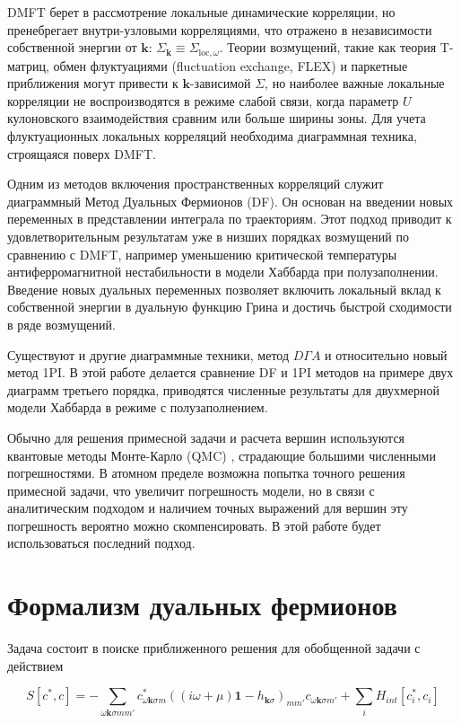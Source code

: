 \documentclass[11pt,a4paper]{report}
\begin{document}
DMFT берет в рассмотрение локальные динамические корреляции, но пренебрегает внутри-узловыми корреляциями, что отражено в независимости собственной энергии от $\mathbf{k}$: $\Sigma_\mathbf{k}\equiv \Sigma_{\text{loc},\omega}$. 
Теории возмущений, такие как теория T-матриц, обмен флуктуациями (fluctuation exchange, FLEX) и паркетные приближения\cite{bickers} могут привести к $\mathbf{k}$-зависимой $\Sigma$,
но наиболее важные локальные корреляции не воспроизводятся в режиме слабой связи, когда параметр $U$ кулоновского взаимодействия сравним или больше ширины зоны.
Для учета флуктуационных локальных корреляций необходима диаграммная техника, строящаяся поверх DMFT.

Одним из методов включения пространственных корреляций служит диаграммный Метод Дуальных Фермионов (DF)\cite{PhysRevB.77.033101}. Он основан на введении новых переменных в представлении интеграла по траекториям.
Этот подход приводит к удовлетворительным результатам уже в низших порядках возмущений по сравнению с DMFT, например уменьшению критической температуры антиферромагнитной нестабильности в модели Хаббарда 
при полузаполнении\cite{PhysRevB.77.195105}. Введение новых дуальных переменных позволяет включить локальный вклад к собственной энергии в дуальную функцию Грина и достичь быстрой сходимости в ряде возмущений.

Существуют и другие диаграммные техники, метод $D\Gamma A$\cite{toschi2007dynamical}\cite{katanin2009comparing} и относительно новый метод 1PI\cite{katanin}. 
В этой работе делается сравнение DF и 1PI методов на примере двух диаграмм третьего порядка, приводятся численные результаты для двухмерной модели Хаббарда в режиме с полузаполнением.

Обычно для решения примесной задачи и расчета вершин используются квантовые методы Монте-Карло (QMC) \cite{rubtsov2005continuous}, страдающие большими численными погрешностями. 
В атомном пределе возможна попытка точного решения примесной задачи, что увеличит погрешность модели, но в связи с аналитическим подходом и наличием точных выражений для вершин эту погрешность вероятно
можно скомпенсировать. В этой работе будет использоваться последний подход.

\section{Формализм дуальных фермионов}
Задача состоит в поиске приближенного решения для обобщенной задачи с действием

\begin{equation}
\label{action}
 S\left[c^*,c\right] = - \sum_{\omega\mathbf{k}\sigma m m'} c^*_{\omega\mathbf{k}\sigma m} ((i\omega+\mu)\mathbf{1}-h_{\mathbf{k}\sigma})_{m m'}c_{\omega\mathbf{k}\sigma m'} + \sum_i H_{int}[c_i^*,c_i]
\end{equation}
\end{document}
